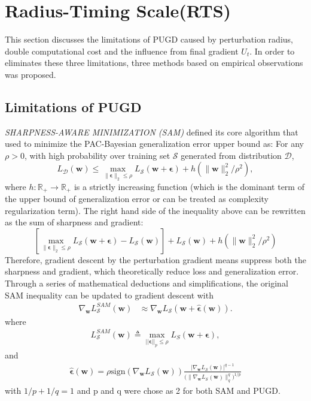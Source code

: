 \documentclass[10pt,twocolumn,letterpaper]{article}
\begin{document}
\section{Radius-Timing Scale(RTS)}
\label{sec:3}
This section discusses the limitations of PUGD caused by perturbation radius, double computational cost and the influence from final gradient $U_t$. In order to eliminates these three limitations, three methods based on empirical observations was proposed. 

\subsection{Limitations of PUGD}
\label{subsec:3.1}
\textit{SHARPNESS-AWARE MINIMIZATION (SAM)} \cite{foret2021sharpnessawareminimizationefficientlyimproving} defined its core algorithm that used to minimize the PAC-Bayesian generalization error upper bound as:
For any $\rho>0$, with high probability over training set $\mathcal{S}$ generated from distribution $\mathscr{D}$, $$L_\mathscr{D}(\boldsymbol{w}) \leq \max_{\|\boldsymbol{\epsilon}\|_2 \leq \rho} L_\mathcal{S}(\boldsymbol{w}+\boldsymbol{\epsilon}) + h(\|\boldsymbol{w}\|_2^2/\rho^2),$$ where $h: \mathbb{R}_{+}\rightarrow  \mathbb{R}_{+}$ is a strictly increasing function (which is the dominant term of the upper bound of generalization error or can be treated as complexity regularization term).
The right hand side of the inequality above can be rewritten as the sum of sharpness and gradient:
$$[\max_{\|\boldsymbol{\epsilon}\|_2\leq \rho }L_\mathcal{S}(\boldsymbol{w}+\boldsymbol{\epsilon}) - L_\mathcal{S}(\boldsymbol{w})] + L_\mathcal{S}(\boldsymbol{w}) + h(\|\boldsymbol{w}\|_2^2/\rho^2)$$ Therefore, gradient descent by the perturbation gradient means suppress both the sharpness and gradient, which theoretically reduce loss and generalization error. Through a series of mathematical deductions and simplifications, the original SAM inequality can be updated to gradient descent with 
\begin{align*}
\nabla_{\boldsymbol{w}} L^{SAM}_\mathcal{S}(\boldsymbol{w}) & \approx \nabla_{\boldsymbol{w}} L_\mathcal{S}(\boldsymbol{w} + \hat{\boldsymbol{\epsilon}}(\boldsymbol{w})).
\end{align*}
where \begin{align*}
	L^{SAM}_\mathcal{S}(\boldsymbol{w}) \triangleq \max_{||\boldsymbol{\epsilon}||_p\leq \rho} L_S(\boldsymbol{w}+\boldsymbol{\epsilon}),
\end{align*} and 
\begin{align*}
	\hat{\boldsymbol{\epsilon}}(\boldsymbol{w}) = \rho \mbox{sign}\left(\nabla_{\boldsymbol{w}} L_\mathcal{S}(\boldsymbol{w})\right) \frac{\left|\nabla_{\boldsymbol{w}} L_\mathcal{S}(\boldsymbol{w})\right|^{q-1}} {\bigg(\|\nabla_{\boldsymbol{w}} L_\mathcal{S}(\boldsymbol{w})\|_q^q\bigg)^{1/p}}
\end{align*}
with $1/p + 1/q = 1$ and p and q were chose as 2 for both SAM and PUGD. 
\end{document}
